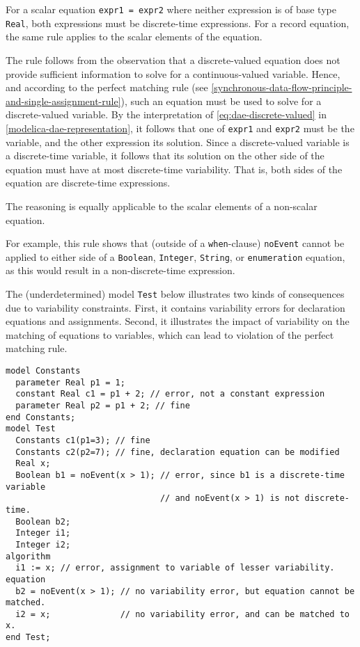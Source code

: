 For a scalar equation \lstinline!expr1 = expr2! where neither expression is of base type \lstinline!Real!, both expressions must be discrete-time expressions.
For a record equation, the same rule applies to the scalar elements of the equation.

\begin{nonnormative}
The rule follows from the observation that a discrete-valued equation does not provide sufficient information to solve for a continuous-valued variable.
Hence, and according to the perfect matching rule (see \cref{synchronous-data-flow-principle-and-single-assignment-rule}), such an equation must be used to solve for a discrete-valued variable.
By the interpretation of \eqref{eq:dae-discrete-valued} in \cref{modelica-dae-representation}, it follows that one of \lstinline!expr1! and \lstinline!expr2! must be the variable, and the other expression its solution.
Since a discrete-valued variable is a discrete-time variable, it follows that its solution on the other side of the equation must have at most discrete-time variability.
That is, both sides of the equation are discrete-time expressions.

The reasoning is equally applicable to the scalar elements of a non-scalar equation.

For example, this rule shows that (outside of a \lstinline!when!-clause) \lstinline!noEvent! cannot be applied to either side of a \lstinline!Boolean!, \lstinline!Integer!, \lstinline!String!, or \lstinline!enumeration! equation, as this would result in a non-discrete-time expression.
\end{nonnormative}

\begin{example}
The (underdetermined) model \lstinline!Test! below illustrates two kinds of consequences due to variability constraints.
First, it contains variability errors for declaration equations and assignments.
Second, it illustrates the impact of variability on the matching of equations to variables, which can
lead to violation of the perfect matching rule.
\begin{lstlisting}[language=modelica]
model Constants
  parameter Real p1 = 1;
  constant Real c1 = p1 + 2; // error, not a constant expression
  parameter Real p2 = p1 + 2; // fine
end Constants;
model Test
  Constants c1(p1=3); // fine
  Constants c2(p2=7); // fine, declaration equation can be modified
  Real x;
  Boolean b1 = noEvent(x > 1); // error, since b1 is a discrete-time variable
                               // and noEvent(x > 1) is not discrete-time.
  Boolean b2;
  Integer i1;
  Integer i2;
algorithm
  i1 := x; // error, assignment to variable of lesser variability.
equation
  b2 = noEvent(x > 1); // no variability error, but equation cannot be matched.
  i2 = x;              // no variability error, and can be matched to x.
end Test;
\end{lstlisting}
\end{example}

